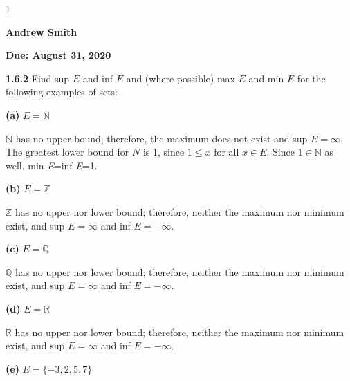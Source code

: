 \documentclass[12pt]{article}
\newcommand{\duedate}{August 31, 2020}
\newcommand{\yourname}{Andrew Smith}
\def\printsolutions{1}
\newcommand{\N}{\mathbb{N}}
\newcommand{\Z}{\mathbb{Z}}
\newcommand{\Q}{\mathbb{Q}}
\newcommand{\R}{\mathbb{R}}
\begin{document}
\if\printsolutions1
\begin{center}
\textbf{\Large \yourname}
\end{center}
\else
\begin{center}
\textbf{\Large Due: \duedate}
\end{center}
\fi


\begin{problem}\textbf{1.6.2}
Find sup $E$ and inf $E$ and (where possible) max $E$ and min $E$ for the following examples of sets:
\end{problem}
\begin{subproblem}\textbf{(a)}
$E=\N$
\end{subproblem}
\begin{solution}\newline
$\N$ has no upper bound; therefore, the maximum does not exist and sup $E=\infty$. The greatest lower bound for $N$ is 1, since $1\leq x$ for all $x\in E$. Since $1\in\N$ as well, min \textit{E}=inf \textit{E}=1.
\end{solution}
\begin{subproblem}\textbf{(b)}
$E=\Z$
\end{subproblem}
\begin{solution}\newline
$\Z$ has no upper nor lower bound; therefore, neither the maximum nor minimum exist, and sup $E=\infty$ and inf $E=-\infty$.
\end{solution}
\begin{subproblem}\textbf{(c)}
$E=\Q$
\end{subproblem}
\begin{solution}\newline
$\Q$ has no upper nor lower bound; therefore, neither the maximum nor minimum exist, and sup $E=\infty$ and inf $E=-\infty$.
\end{solution}
\begin{subproblem}\textbf{(d)}
$E=\R$
\end{subproblem}
\begin{solution}\newline
$\R$ has no upper nor lower bound; therefore, neither the maximum nor minimum exist, and sup $E=\infty$ and inf $E=-\infty$.
\end{solution}
\begin{subproblem}\textbf{(e)}
$E=\{-3,2,5,7\}$
\end{subproblem}
\end{document}
